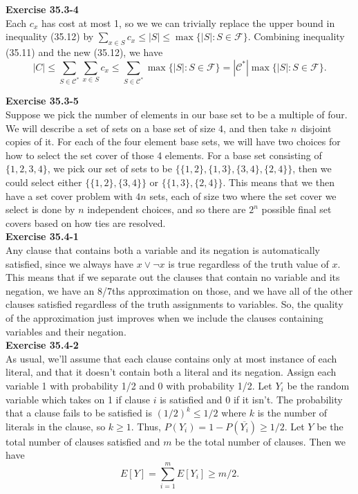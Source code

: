 \documentclass{article}
\begin{document}
\noindent\textbf{Exercise 35.3-4}\\

Each $c_x$ has cost at most 1, so we we can trivially replace the upper bound in inequality (35.12) by $\sum_{x \in S} c_x \leq |S| \leq \max\{|S| : S \in \mathscr{F}\}$.  Combining inequality (35.11) and the new (35.12), we have
\[ |C| \leq \sum_{S \in \mathcal{C}^*} \sum_{x \in S} c_x \leq \sum_{S \in \mathcal{C}^*} \max\{|S| : S \in \mathscr{F}\} = |\mathcal{C}^*|\max\{|S| : S \in \mathscr{F}\}.\]

\noindent\textbf{Exercise 35.3-5}\\

Suppose we pick the number of elements in our base set to be a multiple of four. We will describe a set of sets on a base set of size $4$, and then take $n$ disjoint copies of it. For each of the four element base sets, we will have two choices for how to select the set cover of those 4 elements. For a base set consisting of $\{1,2,3,4\}$, we pick our set of sets to be $\{ \{1,2\},\{1,3\},\{3,4\},\{2,4\}\}$, then we could select either $\{\{1,2\},\{3,4\}\}$ or $\{\{1,3\},\{2,4\}\}$. This means that we then have a set cover problem with $4n$ sets, each of size two where the set cover we select is done by $n$ independent choices, and so there are $2^n$ possible final set covers based on how ties are resolved.\\



\noindent\textbf{Exercise 35.4-1}\\

Any clause that contains both a variable and its negation is automatically satisfied, since we always have $x \vee \neg x$ is true regardless of the truth value of $x$. This means that if we separate out the clauses that contain no variable and its negation, we have an 8/7ths approximation on those, and we have all of the other clauses satisfied regardless of the truth assignments to variables. So, the quality of the approximation just improves when we include the clauses containing variables and their negation.\\

\noindent\textbf{Exercise 35.4-2}\\

As usual, we'll assume that each clause contains only at most instance of each literal, and that it doesn't contain both a literal and its negation.  Assign each variable 1 with probability 1/2 and 0 with probability 1/2.  Let $Y_i$ be the random variable which takes on 1 if clause $i$ is satisfied and 0 if it isn't.  The probability that a clause fails to be satisfied is $(1/2)^k \leq 1/2$ where $k$ is the number of literals in the clause, so $k \geq 1$. Thus, $P(Y_i) = 1 - P(\overline{Y_i}) \geq 1/2$.  Let $Y$ be the total number of clauses satisfied and $m$ be the total number of clauses.  Then we have
\[ E[Y] = \sum_{i=1}^m E[Y_i] \geq m/2.\]
\end{document}
